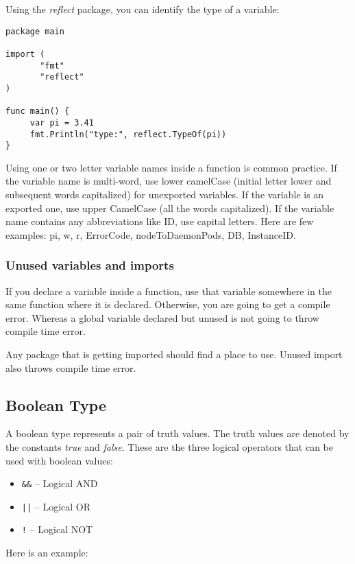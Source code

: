 Using the \textit{reflect} package, you can identify
the type of a variable:

\begin{lstlisting}[caption=Identifying type of a variable]
package main

import (
       "fmt"
       "reflect"
)

func main() {
     var pi = 3.41
     fmt.Println("type:", reflect.TypeOf(pi))
}
\end{lstlisting}

Using one or two letter variable names inside a function is common
practice.  If the variable name is multi-word, use lower camelCase
(initial letter lower and subsequent words capitalized) for unexported
variables.  If the variable is an exported one, use upper CamelCase
(all the words capitalized).  If the variable name contains any
abbreviations like ID, use capital letters.  Here are few examples:
pi, w, r, ErrorCode, nodeToDaemonPods, DB, InstanceID.

\subsubsection{Unused variables and imports}

If you declare a variable inside a function, use that variable
somewhere in the same function where it is declared.  Otherwise, you
are going to get a compile error.  Whereas a global variable declared
but unused is not going to throw compile time error.

Any package that is getting imported should find a place to use.
Unused import also throws compile time error.

\subsection{Boolean Type}

A boolean type represents a pair of truth values.  The truth values
are denoted by the constants \textit{true} and \textit{false}.  These
are the three logical operators that can be used with boolean values:

\begin{itemize}
\item \texttt{\&\&} -- Logical AND
\item \texttt{||} -- Logical OR
\item \texttt{!} -- Logical NOT
\end{itemize}

Here is an example:

